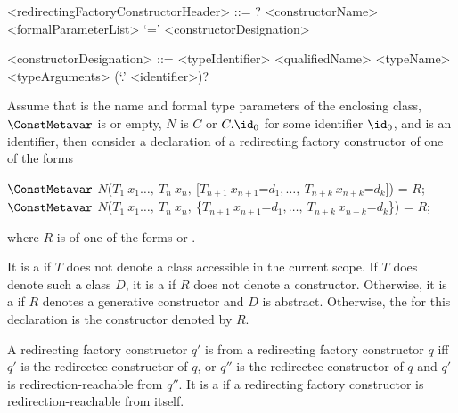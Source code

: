 \documentclass[makeidx]{article}
\begin{document}
\begin{grammar}
<redirectingFactoryConstructorHeader> ::= \gnewline{}
  \CONST? \FACTORY{} <constructorName> <formalParameterList> `=' \gnewline{}
  <constructorDesignation>

<constructorDesignation> ::= <typeIdentifier>
  \alt <qualifiedName>
  \alt <typeName> <typeArguments> (`.' <identifier>)?
\end{grammar}

Assume that
%
is the name and formal type parameters of the enclosing class,
%
$\ConstMetavar$ is \CONST{} or empty,
$N$ is $C$ or $C.\id_0$ for some identifier $\id_0$,
and \DefineSymbol{\id} is an identifier,
then consider a declaration of a redirecting factory constructor
 of one of the forms

\begin{normativeDartCode}
$\ConstMetavar$ \FACTORY{}
    $N$($T_1\ x_1 \ldots,\ T_n\ x_n,\ $[$T_{n+1}\ x_{n+1}$=$d_1, \ldots,\ T_{n+k}\ x_{n+k}$=$d_k$]) = $R$;
\\
$\ConstMetavar$ \FACTORY{}
    $N$($T_1\ x_1 \ldots,\ T_n\ x_n,\ $\{$T_{n+1}\ x_{n+1}$=$d_1, \ldots,\ T_{n+k}\ x_{n+k}$=$d_k$\}) = $R$;
\end{normativeDartCode}

\noindent
{}%
where $R$ is of one of the forms
 or
.

\LMHash{}%
It is a  if $T$ does not denote
a class accessible in the current scope.
If $T$ does denote such a class $D$,
it is a  if $R$ does not denote a constructor.
Otherwise, it is a 
if $R$ denotes a generative constructor and $D$ is abstract.
Otherwise, the
for this declaration is the constructor  denoted by $R$.

\LMHash{}%
A redirecting factory constructor $q'$ is 
from a redirecting factory constructor $q$ if{}f
$q'$ is the redirectee constructor of $q$,
or $q''$ is the redirectee constructor of $q$
and $q'$ is redirection-reachable from $q''$.
It is a  if a redirecting factory constructor
is redirection-reachable from itself.
\end{document}
